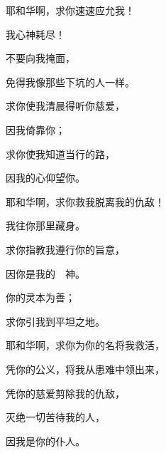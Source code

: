 {\BB \par }{\Q {}耶和华啊，求你速速应允我！
\par }{\Q 我心神耗尽！
\par }{\Q 不要向我掩面，
\par }{\Q 免得我像那些下坑的人一样。
\par }{\Q {}求你使我清晨得听你慈爱{}，
\par }{\Q 因我倚靠你；
\par }{\Q 求你使我知道当行的路，
\par }{\Q 因我的心仰望你。
\par }{\BB \par }{\Q {}耶和华啊，求你救我脱离我的仇敌！
\par }{\Q 我往你那里藏身。
\par }{\Q {}求你指教我遵行你的旨意，
\par }{\Q 因你是我的　神。
\par }{\Q 你的灵本为善；
\par }{\Q 求你引我到平坦之地。
\par }{\BB \par }{\Q {}耶和华啊，求你为你的名将我救活，
\par }{\Q 凭你的公义，将我从患难中领出来，
\par }{\Q {}凭你的慈爱剪除我的仇敌，
\par }{\Q 灭绝一切苦待我的人，
\par }{\Q 因我是你的仆人。

}

